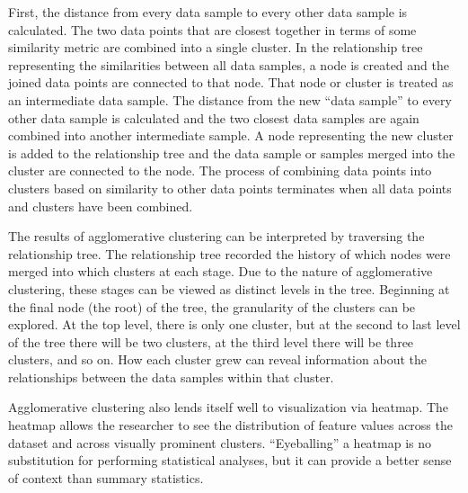 First, the distance from every data sample to every other data sample is calculated. The two data points that are closest together in terms of some similarity metric are combined into a single cluster. In the relationship tree representing the similarities between all data samples, a node is created and the joined data points are connected to that node. That node or cluster is treated as an intermediate data sample. The distance from the new ``data sample'' to every other data sample is calculated and the two closest data samples are again combined into another intermediate sample. A node representing the new cluster is added to the relationship tree and the data sample or samples merged into the cluster are connected to the node. The process of combining data points into clusters based on similarity to other data points terminates when all data points and clusters have been combined. 

The results of agglomerative clustering can be interpreted by traversing the relationship tree. The relationship tree recorded the history of which nodes were merged into which clusters at each stage. Due to the nature of agglomerative clustering, these stages can be viewed as distinct levels in the tree. Beginning at the final node (the root) of the tree, the granularity of the clusters can be explored. At the top level, there is only one cluster, but at the second to last level of the tree there will be two clusters, at the third level there will be three clusters, and so on. How each cluster grew can reveal information about the relationships between the data samples within that cluster.

Agglomerative clustering also lends itself well to visualization via heatmap. The heatmap allows the researcher to see the distribution of feature values across the dataset and across visually prominent clusters. ``Eyeballing'' a heatmap is no substitution for performing statistical analyses, but it can provide a better sense of context than summary statistics. 



